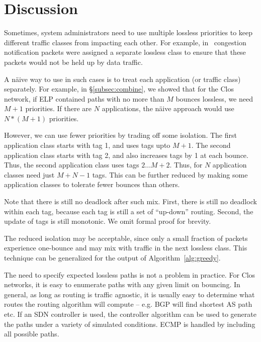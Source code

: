 \section{Discussion}

 Sometimes, system administrators need to
use multiple lossless priorities to keep different traffic classes from
impacting each other. For example, in~\cite{dcqcn} congestion notification
packets were assigned a separate lossless class to ensure that these packets
would not be held up by data traffic.

A n{\"a}ive way to use \sysname{} in such cases is to treat each application (or
traffic class) separately.  For example, in \S\ref{subsec:combine}, we showed
that for the Clos network, if ELP contained paths with no more than $M$ bounces
lossless, we need $M+1$ priorities. If there are $N$ applications, the n{\"a}ive
approach would use $N*(M+1)$ priorities. 

However, we can use fewer priorities by trading off some isolation.  The first
application class starts with tag 1, and uses tags upto $M+1$.  The second
application class starts with tag 2, and also increases tags by 1 at each
bounce.  Thus, the second application class uses tags $2 \ldots M+2$. Thus, for
$N$ application classes need just $M + N -1$ tags. This can be further reduced
by making some application classes to tolerate fewer bounces than others.

Note that there is still no deadlock after such mix. First, there is still no
deadlock within each tag, because each tag is still a set of ``up-down''
routing. Second, the update of tags is still monotonic. We omit formal proof for
brevity.

The reduced isolation may be acceptable, since only a small fraction of packets
experience one-bounce and may mix with traffic in the next lossless class.  This
technique can be generalized for the output of Algorithm~\ref{alg:greedy}.

 The need to specify expected lossless paths is not a
problem in practice. For Clos networks, it is easy to enumerate paths with any
given limit on bouncing. In general, as long as routing is traffic agnostic, it
is usually easy to determine what routes the routing algorithm will compute --
e.g. BGP will find shortest AS path etc.  If an SDN controller is used, the
controller algorithm can be used to generate the paths under a variety of
simulated conditions. ECMP is handled by including all possible paths.

